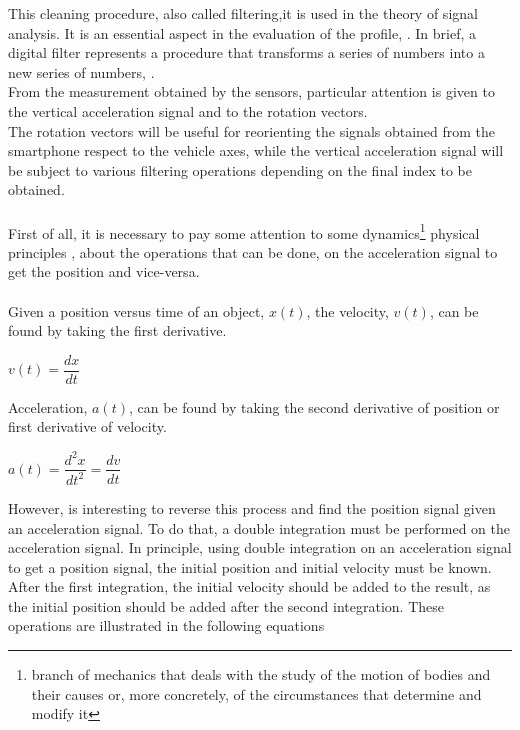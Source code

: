 \documentclass[tesi]{subfiles}
\begin{document}
\noindent This cleaning procedure, also called filtering,it is used in the theory of signal analysis.
It is an essential aspect in the evaluation of the profile, \cite{little_book}. In brief, a digital filter represents a procedure that transforms a series of numbers into a new series of numbers, \cite{little_book}.\\
From the measurement obtained by the sensors, particular attention is given to the vertical acceleration signal and to the rotation vectors. \\
The rotation vectors will be useful for reorienting the signals obtained from the smartphone\cite{Andro} respect to the vehicle axes, while the vertical acceleration signal will be subject to various filtering operations depending on the final index to be obtained.\\\\
First of all, it is necessary to pay some attention to some dynamics\footnote{branch of mechanics that deals with the study of the motion of bodies and their causes or, more concretely, of the circumstances that determine and modify it} physical principles , about the operations that can be done, on the acceleration signal to get the position and vice-versa.\\\\
Given a position versus time of an object, $x(t)$, the velocity, $v(t)$, can be found by taking the first derivative.\\
\begin{center}
{\large $v(t) = \dfrac{dx}{dt}$}
\end{center}
Acceleration, $a(t)$, can be found by taking the second derivative of position or first
derivative of velocity.
\begin{center}
{\large $a(t) = \dfrac{d^{2}x}{dt^{2}} = \dfrac{dv}{dt}$}
\end{center}
However, is interesting to reverse this process and find the position signal given an acceleration signal. To do that, a double integration must be performed on the acceleration signal.
In principle, using double integration on an acceleration signal to get a position signal, the initial position and initial velocity must be known. After the first integration, the initial velocity should be added to the result, as the initial position should be added after the second integration. These operations are illustrated in the following equations
\end{document}
